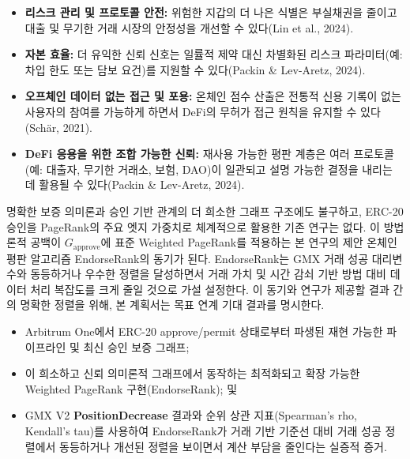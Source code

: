 \begin{itemize}
\item[\textbullet] \textbf{리스크 관리 및 프로토콜 안전: }위험한 지갑의 더 나은 식별은 부실채권을 줄이고 대출 및 무기한 거래 시장의 안정성을 개선할 수 있다(Lin et al., 2024).
\item[\textbullet] \textbf{자본 효율: }더 유익한 신뢰 신호는 일률적 제약 대신 차별화된 리스크 파라미터(예: 차입 한도 또는 담보 요건)를 지원할 수 있다(Packin \& Lev-Aretz, 2024).
\item[\textbullet] \textbf{오프체인 데이터 없는 접근 및 포용: }온체인 점수 산출은 전통적 신용 기록이 없는 사용자의 참여를 가능하게 하면서 DeFi의 무허가 접근 원칙을 유지할 수 있다(Sch\"{a}r, 2021).
\item[\textbullet] \textbf{DeFi 응용을 위한 조합 가능한 신뢰: }재사용 가능한 평판 계층은 여러 프로토콜(예: 대출자, 무기한 거래소, 보험, DAO)이 일관되고 설명 가능한 결정을 내리는 데 활용될 수 있다(Packin \& Lev-Aretz, 2024).
\end{itemize}
명확한 보증 의미론과 승인 기반 관계의 더 희소한 그래프 구조에도 불구하고, ERC-20 승인을 PageRank의 주요 엣지 가중치로 체계적으로 활용한 기존 연구는 없다. 이 방법론적 공백이 $G_{\text{approve}}$에 표준 Weighted PageRank를 적용하는 본 연구의 제안 온체인 평판 알고리즘 EndorseRank의 동기가 된다. EndorseRank는 GMX 거래 성공 대리변수와 동등하거나 우수한 정렬을 달성하면서 거래 가치 및 시간 감쇠 기반 방법 대비 데이터 처리 복잡도를 크게 줄일 것으로 가설 설정한다. 이 동기와 연구가 제공할 결과 간의 명확한 정렬을 위해, 본 계획서는 목표 연계 기대 결과를 명시한다.


\begin{itemize}
\item[\textbullet] Arbitrum One에서 ERC-20 approve/permit 상태로부터 파생된 재현 가능한 파이프라인 및 최신 승인 보증 그래프;
\item[\textbullet] 이 희소하고 신뢰 의미론적 그래프에서 동작하는 최적화되고 확장 가능한 Weighted PageRank 구현(EndorseRank); 및
\item[\textbullet] GMX V2 \textbf{PositionDecrease} 결과와 순위 상관 지표(Spearman's rho, Kendall's tau)를 사용하여 EndorseRank가 거래 기반 기준선 대비 거래 성공 정렬에서 동등하거나 개선된 정렬을 보이면서 계산 부담을 줄인다는 실증적 증거.
\end{itemize}

